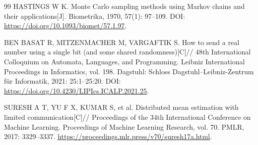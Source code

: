\begin{thebibliography}{99}
HASTINGS W K.
Monte Carlo sampling methods using Markov chains and their applications[J].
Biometrika, 1970, 57(1): 97--109.
DOI: \url{https://doi.org/10.1093/biomet/57.1.97}.

BEN BASAT R, MITZENMACHER M, VARGAFTIK S.
How to send a real number using a single bit (and some shared randomness)[C]//
48th International Colloquium on Automata, Languages, and Programming.
Leibniz International Proceedings in Informatics, vol. 198.
Dagstuhl: Schloss Dagstuhl--Leibniz-Zentrum f\"ur Informatik, 2021: 25:1--25:20.
DOI: \url{https://doi.org/10.4230/LIPIcs.ICALP.2021.25}.

SURESH A T, YU F X, KUMAR S, et al.
Distributed mean estimation with limited communication[C]//
Proceedings of the 34th International Conference on Machine Learning.
Proceedings of Machine Learning Research, vol. 70.
PMLR, 2017: 3329--3337.
\url{https://proceedings.mlr.press/v70/suresh17a.html}.

\end{thebibliography}
